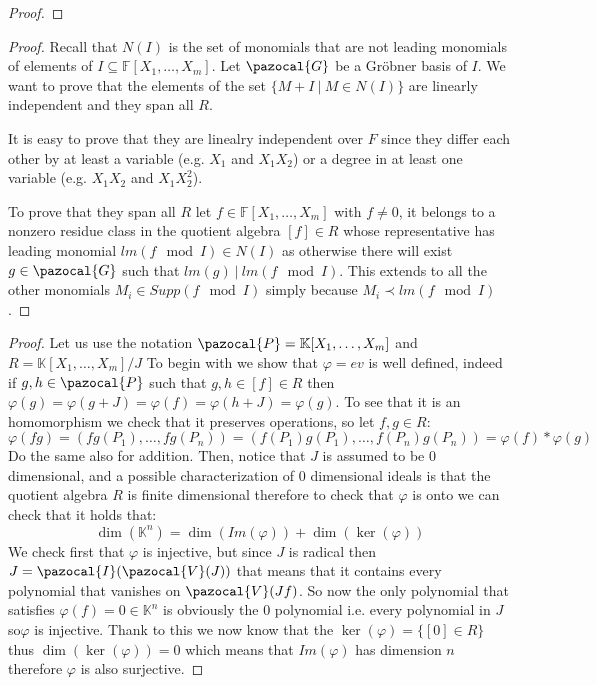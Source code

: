\documentclass[11pt,a4paper]{report}
\theoremstyle{plain}
\theoremstyle{definition}
\newcommand{\I}{\pazocal{I}}
\newcommand{\V}{\pazocal{V}}
\newcommand{\G}{\pazocal{G}}
\begin{document}
\begin{ex-hand}[3.5.10]
\end{ex-hand}
\begin{proof}

\end{proof}

\begin{prop-hand}[3.4.2]
\end{prop-hand}

\begin{proof}
	Recall that $N(I)$ is the set of monomials that are not leading monomials of elements of $I \subseteq \mathbb{F}[X_1,\ldots ,X_m]$. Let $\G$ be a Gr\"obner basis of $I$. We want to prove that the elements of the set $\{M + I\ |\ M\in N(I)\}$ are linearly independent and they span all $R$.
	
	It is easy to prove that they are linealry independent over $F$ since they differ each other by at least a variable (e.g. $X_1$ and $X_1X_2$) or a degree in at least one variable (e.g. $X_1X_2$ and $X_1X_2^2$).
	
	To prove that they span all $R$ let $f \in \mathbb{F}[X_1,\ldots ,X_m]$ with $f \neq 0$, it belongs to a nonzero residue class in the quotient algebra $[f] \in R$ whose representative has leading monomial $lm(f \mod I) \in N(I)$ as otherwise there will exist $g \in \G$ such that $lm(g)\ |\ lm(f \mod I)$. This extends to all the other monomials $M_i \in Supp(f \mod I)$ simply because $M_i \prec lm(f \mod I)$.
\end{proof}

\begin{ex-hand}[3.5.10]
\end{ex-hand}
\begin{proof} 
Let us use the notation $\pazocal{P} = \mathbb{K}[X_1,\ldots,X_m]$ and $R = \mathbb{K}[X_1,\ldots,X_m]/J$
To begin with we show that $\varphi = ev$ is well defined, indeed if $g,h \in \pazocal{P}$ such that $g,h \in [f] \in R$ then $\varphi(g) = \varphi(g+J) = \varphi(f) = \varphi(h + J) = \varphi(g)$.
To see that it is an homomorphism we check that it preserves operations, so let $f,g \in R$:
\[
	\varphi(fg) = (fg(P_1), \ldots,fg(P_n)) = (f(P_1)g(P_1),\ldots,f(P_n)g(P_n)) = \varphi(f)*\varphi(g)
\]
Do the same also for addition.
Then, notice that $J$ is assumed to be $0$ dimensional, and a possible characterization of $0$ dimensional ideals is that the quotient algebra $R$ is finite dimensional therefore to check that $\varphi$ is onto we can check that it holds that:
\[
	\dim(\mathbb{K}^n) = \dim(Im(\varphi)) + \dim(\ker(\varphi)) 
\]
We check first that $\varphi$ is injective, but since $J$ is radical then $J = \I(\V(J))$ that means that it contains every polynomial that vanishes on $\V(Jf)$. So now the only polynomial that satisfies $\varphi(f) = 0 \in \mathbb{K}^n$ is obviously the $0$ polynomial i.e. every polynomial in $J$ so$\varphi$ is injective.
Thank to this we now know that the $\ker(\varphi) = \{[0] \in R\}$ thus $\dim(\ker(\varphi))=0$ which means that $Im(\varphi)$ has dimension $n$ therefore $\varphi$ is also surjective.
\end{proof}
\end{document}
